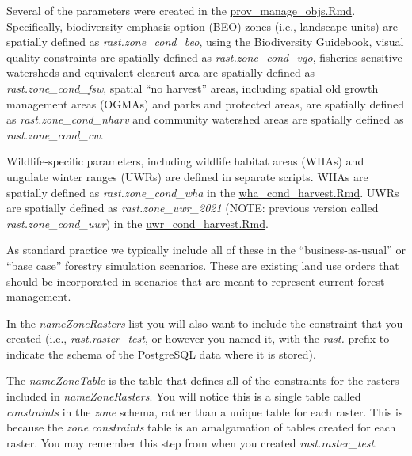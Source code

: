 \documentclass[
]{article}
\begin{document}
Several of the parameters were created in the
\href{https://github.com/bcgov/clus/blob/main/R/Params/prov_manage_objs.Rmd}{prov\_manage\_objs.Rmd}.
Specifically, biodiversity emphasis option (BEO) zones (i.e., landscape
units) are spatially defined as \emph{rast.zone\_cond\_beo}, using the
\href{https://www.for.gov.bc.ca/ftp/hfp/external/!publish/FPC\%20archive/old\%20web\%20site\%20contents/fpc/fpcguide/BIODIV/chap1.htm\#bid}{Biodiversity
Guidebook}, visual quality constraints are spatially defined as
\emph{rast.zone\_cond\_vqo}, fisheries sensitive watersheds and
equivalent clearcut area are spatially defined as
\emph{rast.zone\_cond\_fsw}, spatial ``no harvest'' areas, including
spatial old growth management areas (OGMAs) and parks and protected
areas, are spatially defined as \emph{rast.zone\_cond\_nharv} and
community watershed areas are spatially defined as
\emph{rast.zone\_cond\_cw}.

Wildlife-specific parameters, including wildlife habitat areas (WHAs)
and ungulate winter ranges (UWRs) are defined in separate scripts. WHAs
are spatially defined as \emph{rast.zone\_cond\_wha} in the
\href{https://github.com/bcgov/clus/blob/main/R/Params/wha_cond_harvest.Rmd}{wha\_cond\_harvest.Rmd}.
UWRs are spatially defined as \emph{rast.zone\_uwr\_2021} (NOTE:
previous version called \emph{rast.zone\_cond\_uwr}) in the
\href{https://github.com/bcgov/clus/blob/main/R/Params/uwr_cond_harvest.Rmd}{uwr\_cond\_harvest.Rmd}.

As standard practice we typically include all of these in the
``business-as-usual'' or ``base case'' forestry simulation scenarios.
These are existing land use orders that should be incorporated in
scenarios that are meant to represent current forest management.

In the \emph{nameZoneRasters} list you will also want to include the
constraint that you created (i.e., \emph{rast.raster\_test}, or however
you named it, with the \emph{rast.} prefix to indicate the schema of the
PostgreSQL data where it is stored).

The \emph{nameZoneTable} is the table that defines all of the
constraints for the rasters included in \emph{nameZoneRasters}. You will
notice this is a single table called \emph{constraints} in the
\emph{zone} schema, rather than a unique table for each raster. This is
because the \emph{zone.constraints} table is an amalgamation of tables
created for each raster. You may remember this step from when you
created \emph{rast.raster\_test}.
\end{document}
